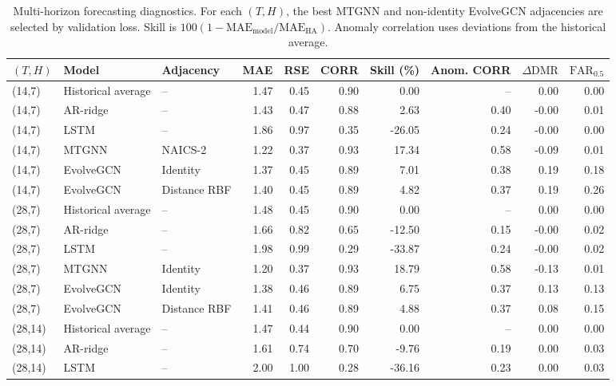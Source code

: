 \documentclass[preprint,authoryear,11pt]{elsarticle}
\theoremstyle{definition}
\begin{document}
\begin{table}[!htbp]
\centering
\begingroup
\singlespacing
\fontsize{9pt}{10pt}\selectfont
\setlength{\tabcolsep}{3pt}
\renewcommand{\arraystretch}{0.92}
\captionsetup{skip=4pt}
\caption{Multi-horizon forecasting diagnostics. For each \((T,H)\), the best MTGNN and non-identity EvolveGCN adjacencies are selected by validation loss. Skill is \(100(1-\mathrm{MAE}_{\mathrm{model}}/\mathrm{MAE}_{\mathrm{HA}})\). Anomaly correlation uses deviations from the historical average.}
\label{tab:multihorizon}
\begin{adjustbox}{max width=\linewidth}
\begin{tabular}{lllrrrrrrr}
\toprule
\((T,H)\) & Model & Adjacency & MAE & RSE & CORR &
Skill (\%) & Anom. CORR & \(\Delta\mathrm{DMR}\) &
\(\mathrm{FAR}_{0.5}\) \\
\midrule
(14,7) & Historical average & -- & 1.47 & 0.45 & 0.90 & 0.00 & -- & 0.00 & 0.00 \\
(14,7) & AR-ridge & -- & 1.43 & 0.47 & 0.88 & 2.63 & 0.40 & -0.00 & 0.01 \\
(14,7) & LSTM & -- & 1.86 & 0.97 & 0.35 & -26.05 & 0.24 & -0.00 & 0.00 \\
(14,7) & MTGNN & NAICS-2 & 1.22 & 0.37 & 0.93 & 17.34 & 0.58 & -0.09 & 0.01 \\
(14,7) & EvolveGCN & Identity & 1.37 & 0.45 & 0.89 & 7.01 & 0.38 & 0.19 & 0.18 \\
(14,7) & EvolveGCN & Distance RBF & 1.40 & 0.45 & 0.89 & 4.82 & 0.37 & 0.19 & 0.26 \\
\midrule
(28,7) & Historical average & -- & 1.48 & 0.45 & 0.90 & 0.00 & -- & 0.00 & 0.00 \\
(28,7) & AR-ridge & -- & 1.66 & 0.82 & 0.65 & -12.50 & 0.15 & -0.00 & 0.02 \\
(28,7) & LSTM & -- & 1.98 & 0.99 & 0.29 & -33.87 & 0.24 & -0.00 & 0.02 \\
(28,7) & MTGNN & Identity & 1.20 & 0.37 & 0.93 & 18.79 & 0.58 & -0.13 & 0.01 \\
(28,7) & EvolveGCN & Identity & 1.38 & 0.46 & 0.89 & 6.75 & 0.37 & 0.13 & 0.13 \\
(28,7) & EvolveGCN & Distance RBF & 1.41 & 0.46 & 0.89 & 4.88 & 0.37 & 0.08 & 0.15 \\
\midrule
(28,14) & Historical average & -- & 1.47 & 0.44 & 0.90 & 0.00 & -- & 0.00 & 0.00 \\
(28,14) & AR-ridge & -- & 1.61 & 0.74 & 0.70 & -9.76 & 0.19 & 0.00 & 0.03 \\
(28,14) & LSTM & -- & 2.00 & 1.00 & 0.28 & -36.16 & 0.23 & 0.00 & 0.03 \\

\end{tabular}
\end{adjustbox}
\end{table}
\end{document}
